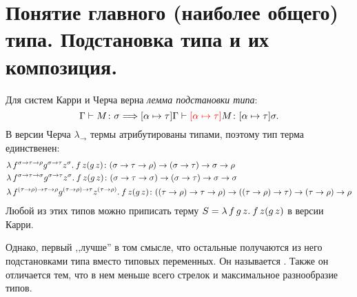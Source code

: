 \documentclass[11pt,a4paper]{article}
\begin{document}
\section{Понятие главного (наиболее общего) типа. Подстановка типа и их композиция.}
Для систем Карри и {\color{red}Черча} верна \textit{лемма подстановки типа}:
\[
	\Gamma \vdash M\colon \sigma  \Longrightarrow [ \alpha  \mapsto  \tau ] \Gamma \vdash {\color{red} [\alpha \mapsto \tau] }M \colon [\alpha \mapsto \tau] \sigma
.\] 
В версии Черча $ \lambda_{\to}$ термы атрибутированы типами, поэтому тип терма единственен:
\[
\begin{aligned}
	& \lambda\,{f^{ \sigma \to \tau \to \rho} g^{ \sigma \to  \tau } z^{ \sigma }}.\:{f\,z(g\,z)} \colon ( \sigma \to  \tau \to  \rho) \to (\sigma \to \tau ) \to  \sigma \to  \rho \\
	& \lambda\,{f^{ \sigma \to \tau \to \sigma} g^{ \sigma \to  \tau } z^{ \sigma }}.\:{f\,z(g\,z)} \colon ( \sigma \to  \tau \to  \sigma) \to (\sigma \to \tau ) \to  \sigma \to  \sigma \\
	& \lambda\,{f^{ (\tau \to \rho) \to \tau \to \rho} g^{ (\tau \to \rho) \to  \tau } z^{ (\tau \to \rho) }}.\:{f\,z(g\,z)} \colon ( (\tau \to \rho) \to  \tau \to  \rho) \to ((\tau \to \rho) \to \tau ) \to  (\tau \to \rho) \to  \rho 
\end{aligned}
\]
Любой из этих типов можно приписать терму
$S = \lambda\,{f\, g\, z}.\:{f\, z (g\, z)}$ в версии Карри.

Однако, первый ,,лучше'' в том смысле, что остальные получаются из него подстановками типа вместо типовых переменных. Он называется . Также он отличается тем, что в нем меньше всего стрелок и максимальное разнообразие типов. 
\end{document}
